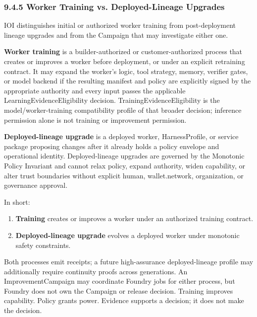\documentclass[
  11pt,
]{article}
\providecommand{\tightlist}{%
  \setlength{\itemsep}{0pt}\setlength{\parskip}{0pt}}
\begin{document}
\hypertarget{worker-training-vs.-deployed-lineage-upgrades}{%
\subsubsection{9.4.5 Worker Training vs. Deployed-Lineage
Upgrades}\label{worker-training-vs.-deployed-lineage-upgrades}}

IOI distinguishes initial or authorized worker training from
post-deployment lineage upgrades and from the Campaign that may investigate
either one.

\textbf{Worker training} is a builder-authorized or customer-authorized
process that creates or improves a worker before deployment, or under an
explicit retraining contract. It may expand the worker's logic, tool
strategy, memory, verifier gates, or model backend if the resulting
manifest and policy are explicitly signed by the appropriate authority and
every input passes the applicable LearningEvidenceEligibility decision.
TrainingEvidenceEligibility is the model/worker-training compatibility profile
of that broader decision; inference permission alone is not training or
improvement permission.

\textbf{Deployed-lineage upgrade} is a deployed worker, HarnessProfile,
or service package proposing changes after it already holds a policy
envelope and operational identity. Deployed-lineage upgrades are
governed by the Monotonic Policy Invariant and cannot relax policy,
expand authority, widen capability, or alter trust boundaries without
explicit human, wallet.network, organization, or governance approval.

In short:

\begin{enumerate}
\def\labelenumi{\arabic{enumi}.}
\tightlist
\item
  \textbf{Training} creates or improves a worker under an authorized
  training contract.
\item
  \textbf{Deployed-lineage upgrade} evolves a deployed worker under
  monotonic safety constraints.
\end{enumerate}

Both processes emit receipts; a future high-assurance deployed-lineage
profile may additionally require continuity proofs across generations. An
ImprovementCampaign may coordinate Foundry jobs for either process, but Foundry
does not own the Campaign or release decision. Training improves capability.
Policy grants power. Evidence supports a decision; it does not make the
decision.
\end{document}
